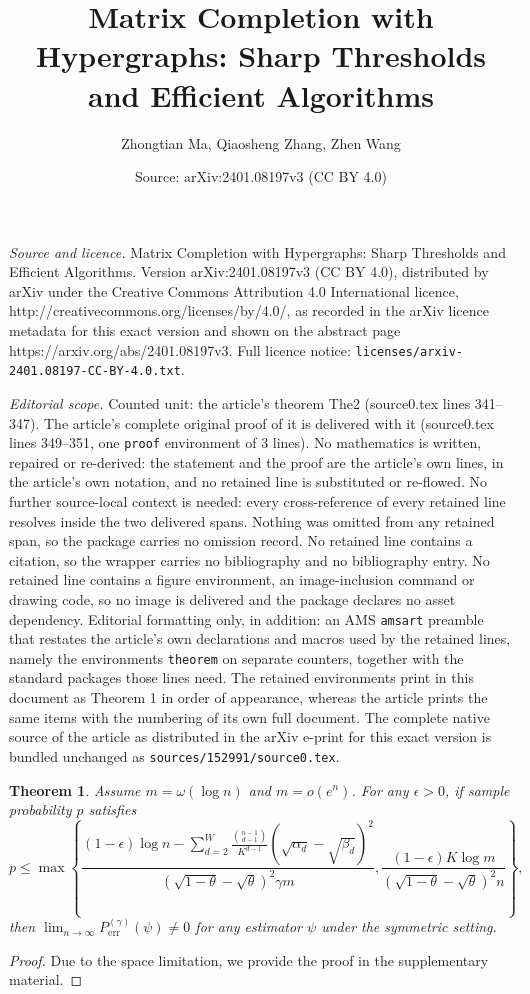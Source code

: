 \documentclass[10pt,a4paper]{amsart}
\title{Matrix Completion with Hypergraphs: Sharp Thresholds and Efficient Algorithms}
\author{Zhongtian Ma, Qiaosheng Zhang, Zhen Wang}
\date{Source: arXiv:2401.08197v3 (CC BY 4.0)}
\newtheorem{theorem}{Theorem}
\begin{document}
\maketitle

\noindent\emph{Source and licence.} Matrix Completion with Hypergraphs: Sharp Thresholds and Efficient Algorithms. Version arXiv:2401.08197v3 (CC BY 4.0), distributed by arXiv under the Creative Commons Attribution 4.0 International licence, http://creativecommons.org/licenses/by/4.0/, as recorded in the arXiv licence metadata for this exact version and shown on the abstract page https://arxiv.org/abs/2401.08197v3. Full licence notice: \texttt{licenses/arxiv-2401.08197-CC-BY-4.0.txt}.\par\smallskip

\noindent\textit{Editorial scope.} Counted unit: the article's theorem The2 (source0.tex lines 341--347). The article's complete original proof of it is delivered with it (source0.tex lines 349--351, one \texttt{proof} environment of 3 lines). No mathematics is written, repaired or re-derived: the statement and the proof are the article's own lines, in the article's own notation, and no retained line is substituted or re-flowed.  No further source-local context is needed: every cross-reference of every retained line resolves inside the two delivered spans.  Nothing was omitted from any retained span, so the package carries no omission record.  No retained line contains a citation, so the wrapper carries no bibliography and no bibliography entry.  No retained line contains a figure environment, an image-inclusion command or drawing code, so no image is delivered and the package declares no asset dependency.  Editorial formatting only, in addition: an AMS \texttt{amsart} preamble that restates the article's own declarations and macros used by the retained lines, namely the environments \texttt{theorem} on separate counters, together with the standard packages those lines need.  The retained environments print in this document as Theorem 1 in order of appearance, whereas the article prints the same items with the numbering of its own full document.  The complete native source of the article as distributed in the arXiv e-print for this exact version is bundled unchanged as \texttt{sources/152991/source0.tex}.
\begin{theorem}\label{The2}
Assume $m=\omega(\log n)$ and $m=o(e^n)$. For any $\epsilon > 0$, if sample probability $p$ satisfies   
    \begin{equation}\label{eq5}
        p \leq \max \left\{ \frac{(1-\epsilon)\log n - \sum_{d=2}^{W} \frac{\binom{n-1}{d-1}}{K^{d-1}} (\sqrt{\alpha_d}-\sqrt{\beta_d})^2}{(\sqrt{1-\theta} - \sqrt{\theta})^2 \gamma m}, \frac{ (1-\epsilon) K \log m}{(\sqrt{1-\theta} - \sqrt{\theta})^2 n} \right\}, 
    \end{equation}
    then $\lim_{n \rightarrow \infty }P_{\mathrm{err}}^{(\gamma)}(\psi) \neq 0$ for any estimator $\psi$ under the  symmetric setting.
\end{theorem}

\begin{proof}
    Due to the space limitation, we provide the proof in the supplementary material.
\end{proof}
\end{document}
